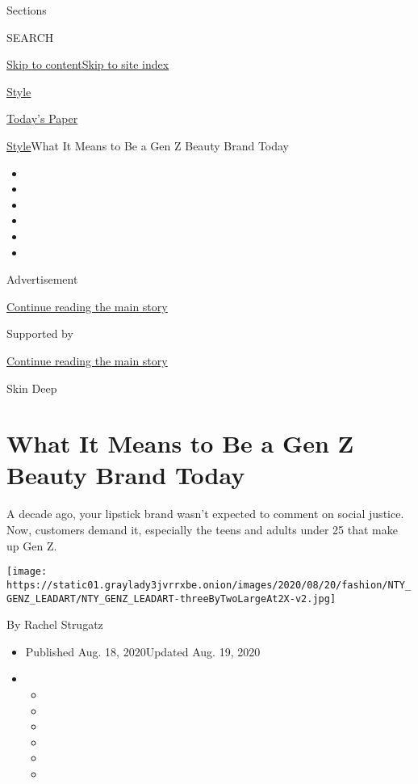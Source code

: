 Sections

SEARCH

\protect\hyperlink{site-content}{Skip to
content}\protect\hyperlink{site-index}{Skip to site index}

\href{https://www.nytimes3xbfgragh.onion/section/style}{Style}

\href{https://myaccount.nytimes3xbfgragh.onion/auth/login?response_type=cookie\&client_id=vi}{}

\href{https://www.nytimes3xbfgragh.onion/section/todayspaper}{Today's
Paper}

\href{/section/style}{Style}\textbar{}What It Means to Be a Gen Z Beauty
Brand Today

\begin{itemize}
\item
\item
\item
\item
\item
\item
\end{itemize}

Advertisement

\protect\hyperlink{after-top}{Continue reading the main story}

Supported by

\protect\hyperlink{after-sponsor}{Continue reading the main story}

Skin Deep

\hypertarget{what-it-means-to-be-a-gen-z-beauty-brand-today}{%
\section{What It Means to Be a Gen Z Beauty Brand
Today}\label{what-it-means-to-be-a-gen-z-beauty-brand-today}}

A decade ago, your lipstick brand wasn't expected to comment on social
justice. Now, customers demand it, especially the teens and adults under
25 that make up Gen Z.

\texttt{[image: https://static01.graylady3jvrrxbe.onion/images/2020/08/20/fashion/NTY\_GENZ\_LEADART/NTY\_GENZ\_LEADART-threeByTwoLargeAt2X-v2.jpg]}

By Rachel Strugatz

\begin{itemize}
\item
  Published Aug. 18, 2020Updated Aug. 19, 2020
\item
  \begin{itemize}
  \item
  \item
  \item
  \item
  \item
  \item
  \end{itemize}
\end{itemize}

